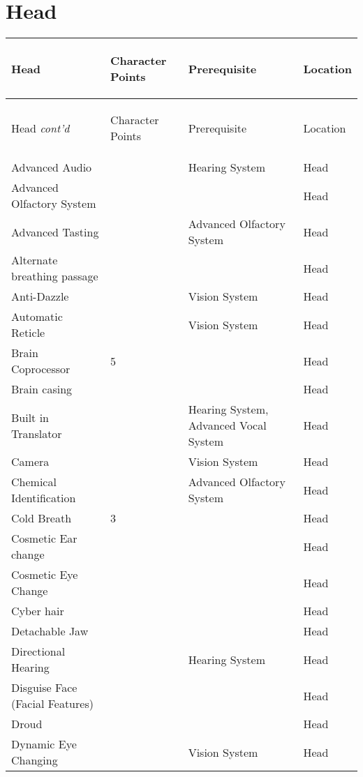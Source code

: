 \documentclass[twoside]{book}
\begin{document}
\section{Head}
    
\begin{longtable}{p{1.25in}p{2em}ll} 
  Head& \begin{turn}{70}{Character Points}\end{turn}
          & \begin{turn}{70}{Prerequisite}\end{turn}
          & \begin{turn}{70}{Location}\end{turn}
          \\
  \hline
  \hline
  \endfirsthead
  Head \textit{cont'd}
        & \begin{turn}{70}{Character Points}\end{turn}
          & \begin{turn}{70}{Prerequisite}\end{turn}
          & \begin{turn}{70}{Location}\end{turn}
           \\
  \hline
  \endhead
\raggedright Advanced Audio&&Hearing System&Head\tabularnewline
      \raggedright Advanced Olfactory System&&&Head\tabularnewline
      \raggedright Advanced Tasting&&Advanced Olfactory System&Head\tabularnewline
      \raggedright Alternate breathing passage&&&Head\tabularnewline
      \raggedright Anti-Dazzle&&Vision System&Head\tabularnewline
      \raggedright Automatic Reticle&&Vision System&Head\tabularnewline
      \raggedright Brain Coprocessor&5&&Head\tabularnewline
      \raggedright Brain casing&&&Head\tabularnewline
      \raggedright Built in Translator&&Hearing System, Advanced Vocal System&Head\tabularnewline
      \raggedright Camera&&Vision System&Head\tabularnewline
      \raggedright Chemical Identification&&Advanced Olfactory System&Head\tabularnewline
      \raggedright Cold Breath&3&&Head\tabularnewline
      \raggedright Cosmetic Ear change&&&Head\tabularnewline
      \raggedright Cosmetic Eye Change&&&Head\tabularnewline
      \raggedright Cyber hair&&&Head\tabularnewline
      \raggedright Detachable Jaw&&&Head\tabularnewline
      \raggedright Directional Hearing&&Hearing System&Head\tabularnewline
      \raggedright Disguise Face (Facial Features)&&&Head\tabularnewline
      \raggedright Droud&&&Head\tabularnewline
      \raggedright Dynamic Eye Changing&&Vision System&Head\tabularnewline

\end{longtable}
\end{document}
